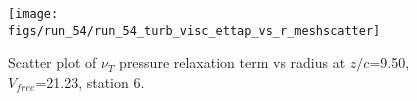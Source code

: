 \begin{figure}[H]
\centering
\texttt{[image: figs/run\_54/run\_54\_turb\_visc\_ettap\_vs\_r\_meshscatter]}
\caption{Scatter plot of $\nu_T$ pressure relaxation term vs radius at $z/c$=9.50, $V_{free}$=21.23, station 6.}
\label{fig:run_54_turb_visc_ettap_vs_r_meshscatter}
\end{figure}


